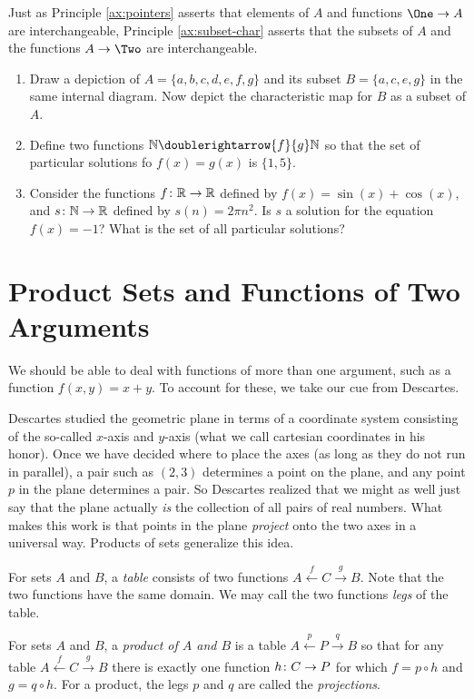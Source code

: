 Just as Principle \ref{ax:pointers} asserts that elements of $A$ and functions $\One\to A$ are interchangeable, Principle \ref{ax:subset-char} asserts that the subsets of $A$ and the functions $A\to\Two$ are interchangeable.

\begin{exercises}
	\begin{enumerate}
	\item Draw a depiction of $A=\{a,b,c,d,e,f,g\}$ and its subset $B=\{a,c,e,g\}$ in the same internal diagram. Now depict the characteristic map for $B$ as a subset of $A$.
	
	\item Define two functions $\NN\doublerightarrow{f}{g}\NN$ so that the set of particular solutions fo $f(x)=g(x)$ is $\{1,5\}$. 
	
	\item Consider the functions ${f}\colon{\mathbb R}\to{\mathbb R}$ defined by $f(x) = \sin(x) + \cos(x)$, and ${s}\colon{\mathbb N}\to{\mathbb R}$ defined by $s(n) = 2\pi n^2$. 
	Is $s$ a solution for the equation $f(x) = -1$? 
	What is the set of all particular solutions?
	\end{enumerate}
		
\end{exercises}

\section{Product Sets and Functions of Two Arguments}

We should be able to deal with functions of more than one argument, such as a function $f(x,y) = x+y$.
To account for these, we take our cue from Descartes.

Descartes studied the geometric plane in terms of a coordinate system consisting of the so-called $x$-axis and $y$-axis (what we call cartesian coordinates in his honor).
Once we have decided where to place the axes (as long as they do not run in parallel), a pair such as $(2,3)$ determines a point on the plane, and any point $p$ in the plane determines a pair.
So Descartes realized that we might as well just say that the plane actually \emph{is} the collection of all pairs of real numbers.
What makes this work is that points in the plane \emph{project} onto the two axes in a universal way.
Products of sets generalize this idea.

\begin{defn}
For sets $A$ and $B$, a \emph{table} consists of two functions $A\stackrel{f}{\longleftarrow} C\stackrel{g}{\longrightarrow}B$.
Note that the two functions have the same domain. We may call the two functions \emph{legs} of the table.

For sets $A$ and $B$, a \emph{product of $A$ and $B$} is a table $A\stackrel{p}{\longleftarrow} P\stackrel{q}{\longrightarrow}B$ so that for any table $A\stackrel{f}{\longleftarrow} C\stackrel{g}{\longrightarrow}B$ there is exactly one function ${h}\colon{C}\to{P}$ for which $f = p\circ h$ and $g= q\circ h$. 
For a product, the legs $p$ and $q$ are called the \emph{projections}.
\end{defn}

